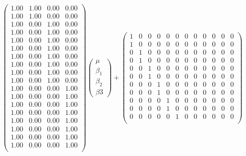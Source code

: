 \documentclass[11pt]{article}
\begin{document}
\[\begin{pmatrix}{}
  1.00 & 1.00 & 0.00 & 0.00 \\ 
  1.00 & 1.00 & 0.00 & 0.00 \\ 
  1.00 & 0.00 & 1.00 & 0.00 \\ 
  1.00 & 0.00 & 1.00 & 0.00 \\ 
  1.00 & 0.00 & 1.00 & 0.00 \\ 
  1.00 & 0.00 & 1.00 & 0.00 \\ 
  1.00 & 0.00 & 1.00 & 0.00 \\ 
  1.00 & 0.00 & 1.00 & 0.00 \\ 
  1.00 & 0.00 & 1.00 & 0.00 \\ 
  1.00 & 0.00 & 1.00 & 0.00 \\ 
  1.00 & 0.00 & 0.00 & 1.00 \\ 
  1.00 & 0.00 & 0.00 & 1.00 \\ 
  1.00 & 0.00 & 0.00 & 1.00 \\ 
  1.00 & 0.00 & 0.00 & 1.00 \\ 
  1.00 & 0.00 & 0.00 & 1.00 \\ 
  1.00 & 0.00 & 0.00 & 1.00 \\ 
  1.00 & 0.00 & 0.00 & 1.00 \\ 
  1.00 & 0.00 & 0.00 & 1.00 \\ 
  \end{pmatrix} \begin{pmatrix} \mu \\ \beta_1 \\ \beta_2\\ \beta3 \end{pmatrix} +
\begin{pmatrix}{}
  1 & 0 & 0 & 0 & 0 & 0 & 0 & 0 & 0 & 0 & 0 & 0 \\ 
  1 & 0 & 0 & 0 & 0 & 0 & 0 & 0 & 0 & 0 & 0 & 0 \\ 
  0 & 1 & 0 & 0 & 0 & 0 & 0 & 0 & 0 & 0 & 0 & 0 \\ 
  0 & 1 & 0 & 0 & 0 & 0 & 0 & 0 & 0 & 0 & 0 & 0 \\ 
  0 & 0 & 1 & 0 & 0 & 0 & 0 & 0 & 0 & 0 & 0 & 0 \\ 
  0 & 0 & 1 & 0 & 0 & 0 & 0 & 0 & 0 & 0 & 0 & 0 \\ 
  0 & 0 & 0 & 1 & 0 & 0 & 0 & 0 & 0 & 0 & 0 & 0 \\ 
  0 & 0 & 0 & 1 & 0 & 0 & 0 & 0 & 0 & 0 & 0 & 0 \\ 
  0 & 0 & 0 & 0 & 1 & 0 & 0 & 0 & 0 & 0 & 0 & 0 \\ 
  0 & 0 & 0 & 0 & 1 & 0 & 0 & 0 & 0 & 0 & 0 & 0 \\ 
  0 & 0 & 0 & 0 & 0 & 1 & 0 & 0 & 0 & 0 & 0 & 0 \\ 

\end{pmatrix}\]
\end{document}
